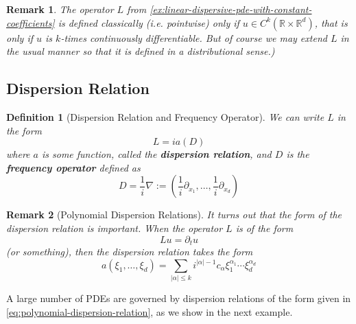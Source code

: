\documentclass{article}
\newtheorem{definition}{Definition}
\newtheorem{remark}{Remark}
\def\R{\mathbb{R}} %
\begin{document}
\begin{remark}
  The operator $L$ from
  \cref{ex:linear-dispersive-pde-with-constant-coefficients} is defined
  classically (i.e. pointwise) only if $u\in C^{k}(\R\times\R^{d})$, that is
  only if $u$ is $k$-times continuously differentiable. But of course we may
  extend $L$ in the usual manner so that it is defined in a distributional
  sense.)
\end{remark}

\subsection{Dispersion Relation}
\begin{definition}[Dispersion Relation and Frequency Operator]
  \label{def:dispersion-relation-frequency-operator}
  We can write $L$ in the form
  \begin{equation*}
    L = ia(D)
  \end{equation*}
  where $a$  is some function, called the \textbf{dispersion relation}, and $D$
  is the \textbf{frequency operator} defined as
  \begin{equation*}
    D = \frac{1}{i}\nabla := \left( \frac{1}{i}\partial_{x_{1}},\ldots,\frac{1}{i}\partial_{x_{d}} \right) 
  \end{equation*}
\end{definition}
\begin{remark}[Polynomial Dispersion Relations]
  \label{rmk:polynomial-dispersion-relation}
  It turns out that the form of the dispersion relation is important. When the
  operator $L$  is of the form
  \begin{equation*}
    Lu= \partial_{t}u
  \end{equation*}
  (or something), then the dispersion relation
  takes the form
  \begin{equation}
    \label{eq:polynomial-dispersion-relation}
    a(\xi_{1},\ldots,\xi_{d})= \sum_{|\alpha| \leq k}i^{|\alpha|-1}c_{\alpha}\xi_{1}^{\alpha_{1}}\cdots \xi_{d}^{\alpha_{d}}
  \end{equation}
\end{remark}
A large number of PDEs are governed by dispersion relations of the form given
in \cref{eq:polynomial-dispersion-relation}, as we show in the next example.
\end{document}
